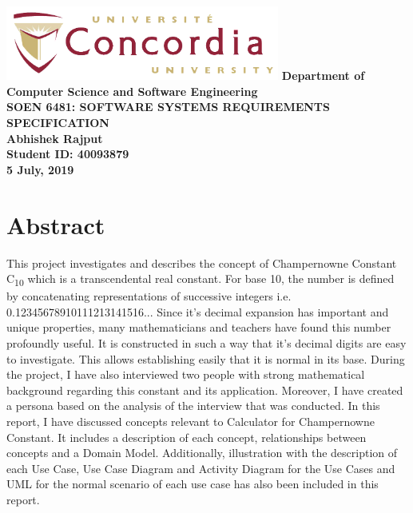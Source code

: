 \documentclass[paper=a4, fontsize=11pt]{report}
\numberwithin{equation}{section}		%
\numberwithin{figure}{section}			%
\numberwithin{table}{section}				%
\begin{document}
\begin{titlepage}
    \centering
    \vfill
    \includegraphics[width=9cm]{Concordia-University-logo.png}
    {\bfseries\Large
        \vskip2cm
        Department of Computer Science and Software Engineering \\
        \vskip2cm
        SOEN 6481: SOFTWARE SYSTEMS REQUIREMENTS SPECIFICATION\\
        \vskip2cm
        Abhishek Rajput\\
        Student ID: 40093879\\
        \vskip9mm
        5 July, 2019\\
    }    
    \vfill
    \vfill
    \vfill
\end{titlepage}

\tableofcontents

\chapter{Abstract}
This project investigates and describes the concept of Champernowne Constant C\textsubscript{10} which is a transcendental real constant. For base 10, the number is defined by concatenating representations of successive integers i.e. 0.12345678910111213141516...
\vskip1mm
Since it's decimal expansion has important and unique properties, many mathematicians and teachers have found this number profoundly useful. It is constructed in such a way that it's decimal digits are easy to investigate. This allows establishing easily that it is normal in its base.
\vskip1mm
During the project, I have also interviewed two people with strong mathematical background regarding this constant and its application. Moreover, I have created a persona based on the analysis of the interview that was conducted.
\vskip1mm
In this report, I have discussed concepts relevant to Calculator for Champernowne Constant. It includes a description of each concept, relationships between concepts and a Domain Model.
\vskip1mm
Additionally, illustration with the description of each Use Case, Use Case Diagram and Activity Diagram for the Use Cases and UML for the normal scenario of each use case has also been included in this report.
\end{document}
